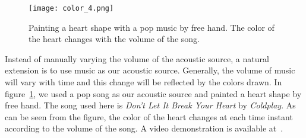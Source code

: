 \begin{figure}[h!]
  \centering
    \texttt{[image: color\_4.png]}
    \caption{Painting a heart shape with a pop music by free hand. The color of the heart changes with the volume of the song.}
    \label{fig:show_color_2}
\end{figure}

Instead of manually varying the volume of the acoustic source, a natural extension is to use music as our acoustic source. Generally, the volume of music will vary with time and this change will be reflected by the colors drawn. In figure~\ref{fig:show_color_2}, we used a pop song as our acoustic source and painted a heart shape by free hand. The song used here is \emph{Don't Let It Break Your Heart} by \emph{Coldplay}. As can be seen from the figure, the color of the heart changes at each time instant according to the volume of the song. A video demonstration is available at~\cite{demo:color2}.
